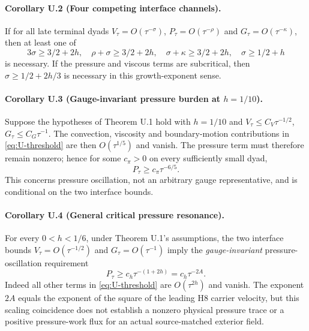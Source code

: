 \paragraph{Corollary U.2 (Four competing interface channels).}
If for all late terminal dyads $V_\tau=O(\tau^{-\sigma})$, $P_\tau=O(\tau^{-\rho})$ and $G_\tau=O(\tau^{-\kappa})$, then at least one of
\begin{equation}\label{eq:U-exponent-alternatives}
 \boxed{3\sigma\ge3/2+2h,\quad \rho+\sigma\ge3/2+2h,\quad
 \sigma+\kappa\ge3/2+2h,\quad \sigma\ge1/2+h}
\end{equation}
is necessary. If the pressure and viscous terms are subcritical, then $\sigma\ge1/2+2h/3$ is necessary in this growth-exponent sense.

\paragraph{Corollary U.3 (Gauge-invariant pressure burden at $h=1/10$).}
Suppose the hypotheses of Theorem U.1 hold with $h=1/10$ and $V_\tau\le C_V\tau^{-1/2}$, $G_\tau\le C_G\tau^{-1}$. The convection, viscosity and boundary-motion contributions in \eqref{eq:U-threshold} are then $O(\tau^{1/5})$ and vanish. The pressure term must therefore remain nonzero; hence for some $c_\pi>0$ on every sufficiently small dyad,
\begin{equation}\label{eq:U-pressure-growth}
 \boxed{P_\tau\ge c_\pi\tau^{-6/5}.}
\end{equation}
This concerns pressure oscillation, not an arbitrary gauge representative, and is conditional on the two interface bounds.

\paragraph{Corollary U.4 (General critical pressure resonance).}
For every $0<h<1/6$, under Theorem U.1's assumptions, the two
interface bounds $V_\tau=O(\tau^{-1/2})$ and
$G_\tau=O(\tau^{-1})$ imply the \emph{gauge-invariant}
pressure-oscillation requirement
\begin{equation}\label{eq:U-general-pressure-growth}
 \boxed{P_\tau\ge c_h\tau^{-(1+2h)}=c_h\tau^{-2A}.}
\end{equation}
Indeed all other terms in \eqref{eq:U-threshold} are
$O(\tau^{2h})$ and vanish. The exponent $2A$
equals the exponent of the square of the leading H8
carrier velocity, but this scaling coincidence does not
establish a nonzero physical pressure trace or a positive
pressure-work flux for an actual source-matched exterior field.

